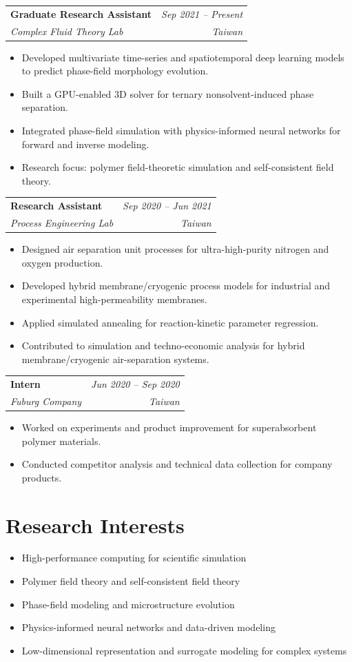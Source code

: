 \documentclass[11pt,letterpaper]{article}
\makeatletter
\newcommand{\datedsubsection}[4]{
  \vspace{0.2em}
  \begin{tabularx}{\textwidth}{@{}Xr@{}}
    \textbf{#1} & \textit{#2} \\
    \textit{#3} & \textit{#4} \\
  \end{tabularx}
}
\newenvironment{tightitemize}{
  \begin{itemize}[leftmargin=1.25em, itemsep=0.15em, topsep=0.2em, parsep=0em, partopsep=0em]
}{
  \end{itemize}
}
\makeatother
\begin{document}
\datedsubsection
  {Graduate Research Assistant}{Sep 2021 -- Present}
  {Complex Fluid Theory Lab}{Taiwan}
\begin{tightitemize}
  \item Developed multivariate time-series and spatiotemporal deep learning models to predict phase-field morphology evolution.
  \item Built a GPU-enabled 3D solver for ternary nonsolvent-induced phase separation.
  \item Integrated phase-field simulation with physics-informed neural networks for forward and inverse modeling.
  \item Research focus: polymer field-theoretic simulation and self-consistent field theory.
\end{tightitemize}

\datedsubsection
  {Research Assistant}{Sep 2020 -- Jun 2021}
  {Process Engineering Lab}{Taiwan}
\begin{tightitemize}
  \item Designed air separation unit processes for ultra-high-purity nitrogen and oxygen production.
  \item Developed hybrid membrane/cryogenic process models for industrial and experimental high-permeability membranes.
  \item Applied simulated annealing for reaction-kinetic parameter regression.
  \item Contributed to simulation and techno-economic analysis for hybrid membrane/cryogenic air-separation systems.
\end{tightitemize}

\datedsubsection
  {Intern}{Jun 2020 -- Sep 2020}
  {Fuburg Company}{Taiwan}
\begin{tightitemize}
  \item Worked on experiments and product improvement for superabsorbent polymer materials.
  \item Conducted competitor analysis and technical data collection for company products.
\end{tightitemize}

\section*{Research Interests}
\begin{tightitemize}
  \item[\textcolor{accent}{\faMicrochip}] High-performance computing for scientific simulation
  \item[\textcolor{accent}{\faAtom}] Polymer field theory and self-consistent field theory
  \item[\textcolor{accent}{\faProjectDiagram}] Phase-field modeling and microstructure evolution
  \item[\textcolor{accent}{\faBrain}] Physics-informed neural networks and data-driven modeling
  \item[\textcolor{accent}{\faChartLine}] Low-dimensional representation and surrogate modeling for complex systems
\end{tightitemize}
\end{document}
